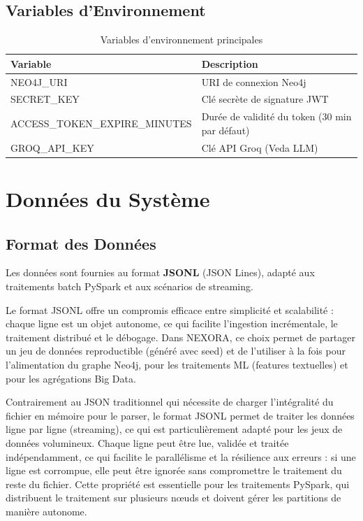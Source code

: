 \documentclass[12pt,a4paper]{report}
\begin{document}
\section{Variables d'Environnement}
\begin{table}[H]
\centering
\caption{Variables d'environnement principales}
\label{tab:env_vars}
\begin{tabular}{p{5cm} p{8cm}}
\toprule
\textbf{Variable} & \textbf{Description} \\
\midrule
NEO4J\_URI & URI de connexion Neo4j \\
SECRET\_KEY & Clé secrète de signature JWT \\
ACCESS\_TOKEN\_EXPIRE\_MINUTES & Durée de validité du token (30 min par défaut) \\
GROQ\_API\_KEY & Clé API Groq (Veda LLM) \\
\bottomrule
\end{tabular}
\end{table}

\newpage
\chapter{Données du Système}

\section{Format des Données}
Les données sont fournies au format \textbf{JSONL} (JSON Lines), adapté aux traitements batch PySpark et aux scénarios de streaming.

Le format JSONL offre un compromis efficace entre simplicité et scalabilité : chaque ligne est un objet autonome, ce qui facilite l'ingestion incrémentale, le traitement distribué et le débogage. Dans NEXORA, ce choix permet de partager un jeu de données reproductible (généré avec seed) et de l'utiliser à la fois pour l'alimentation du graphe Neo4j, pour les traitements ML (features textuelles) et pour les agrégations Big Data.

Contrairement au JSON traditionnel qui nécessite de charger l'intégralité du fichier en mémoire pour le parser, le format JSONL permet de traiter les données ligne par ligne (streaming), ce qui est particulièrement adapté pour les jeux de données volumineux. Chaque ligne peut être lue, validée et traitée indépendamment, ce qui facilite le parallélisme et la résilience aux erreurs : si une ligne est corrompue, elle peut être ignorée sans compromettre le traitement du reste du fichier. Cette propriété est essentielle pour les traitements PySpark, qui distribuent le traitement sur plusieurs nœuds et doivent gérer les partitions de manière autonome.
\end{document}
